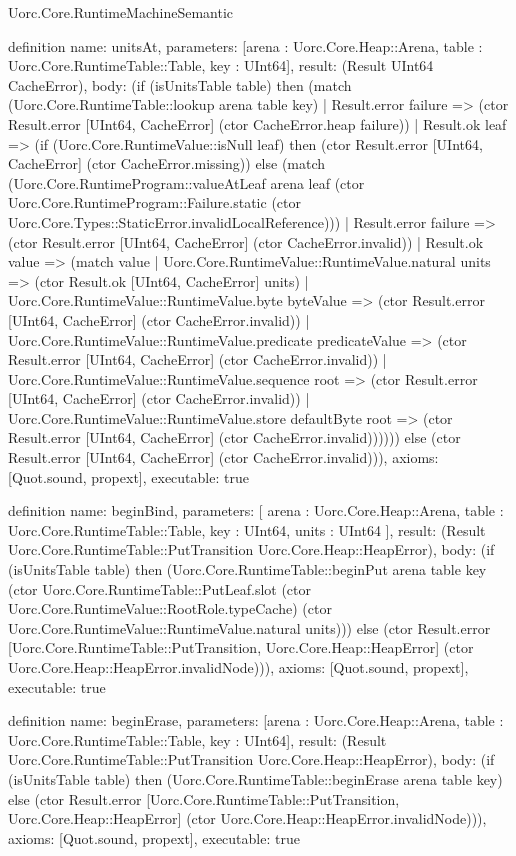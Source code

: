 \begin{lexlean}{Uorc.Core.RuntimeMachineSemantic}
\begin{semanticmodule}
definition{
  name: unitsAt,
  parameters: [arena : Uorc.Core.Heap::Arena, table : Uorc.Core.RuntimeTable::Table, key : UInt64],
  result: (Result UInt64 CacheError),
  body: (if (isUnitsTable table) then (match (Uorc.Core.RuntimeTable::lookup arena table key)
    | Result.error failure => (ctor Result.error [UInt64, CacheError] (ctor CacheError.heap failure))
    | Result.ok leaf => (if (Uorc.Core.RuntimeValue::isNull leaf) then (ctor Result.error [UInt64, CacheError] (ctor CacheError.missing)) else (match (Uorc.Core.RuntimeProgram::valueAtLeaf arena leaf (ctor Uorc.Core.RuntimeProgram::Failure.static (ctor Uorc.Core.Types::StaticError.invalidLocalReference)))
      | Result.error failure => (ctor Result.error [UInt64, CacheError] (ctor CacheError.invalid))
      | Result.ok value => (match value
        | Uorc.Core.RuntimeValue::RuntimeValue.natural units => (ctor Result.ok [UInt64, CacheError] units)
        | Uorc.Core.RuntimeValue::RuntimeValue.byte byteValue => (ctor Result.error [UInt64, CacheError] (ctor CacheError.invalid))
        | Uorc.Core.RuntimeValue::RuntimeValue.predicate predicateValue => (ctor Result.error [UInt64, CacheError] (ctor CacheError.invalid))
        | Uorc.Core.RuntimeValue::RuntimeValue.sequence root => (ctor Result.error [UInt64, CacheError] (ctor CacheError.invalid))
        | Uorc.Core.RuntimeValue::RuntimeValue.store defaultByte root => (ctor Result.error [UInt64, CacheError] (ctor CacheError.invalid)))))) else (ctor Result.error [UInt64, CacheError] (ctor CacheError.invalid))),
  axioms: [Quot.sound, propext],
  executable: true
}

definition{
  name: beginBind,
  parameters: [
    arena : Uorc.Core.Heap::Arena,
    table : Uorc.Core.RuntimeTable::Table,
    key : UInt64,
    units : UInt64
  ],
  result: (Result Uorc.Core.RuntimeTable::PutTransition Uorc.Core.Heap::HeapError),
  body: (if (isUnitsTable table) then (Uorc.Core.RuntimeTable::beginPut arena table key (ctor Uorc.Core.RuntimeTable::PutLeaf.slot (ctor Uorc.Core.RuntimeValue::RootRole.typeCache) (ctor Uorc.Core.RuntimeValue::RuntimeValue.natural units))) else (ctor Result.error [Uorc.Core.RuntimeTable::PutTransition, Uorc.Core.Heap::HeapError] (ctor Uorc.Core.Heap::HeapError.invalidNode))),
  axioms: [Quot.sound, propext],
  executable: true
}

definition{
  name: beginErase,
  parameters: [arena : Uorc.Core.Heap::Arena, table : Uorc.Core.RuntimeTable::Table, key : UInt64],
  result: (Result Uorc.Core.RuntimeTable::PutTransition Uorc.Core.Heap::HeapError),
  body: (if (isUnitsTable table) then (Uorc.Core.RuntimeTable::beginErase arena table key) else (ctor Result.error [Uorc.Core.RuntimeTable::PutTransition, Uorc.Core.Heap::HeapError] (ctor Uorc.Core.Heap::HeapError.invalidNode))),
  axioms: [Quot.sound, propext],
  executable: true
}


\end{semanticmodule}
\end{lexlean}
